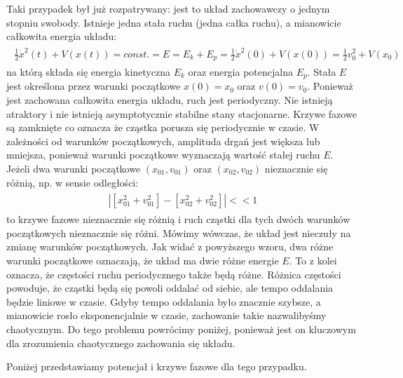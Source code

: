 \documentclass[a4paper,12pt,polish]{sphinxmanual}
\begin{document}
Taki przypadek był już rozpatrywany: jest to układ zachowawczy o jednym stopniu swobody. Istnieje jedna stała ruchu (jedna całka ruchu), a mianowicie całkowita energia układu:
\label{ch2/chII011:equation-eqn10}\begin{gather}
\begin{split}\frac{1}{2} \dot x^2(t) + V(x(t)) = const. = E  = E_k + E_p = \frac{1}{2} \dot x^2(0) + V(x(0)) = \frac{1}{2}  v_0^2 + V(x_0)\end{split}\label{ch2/chII011-eqn10}
\end{gather}
na którą składa się energia kinetyczna $E_k$ oraz energia potencjalna $E_p$.  Stała $E$ jest określona przez warunki początkowe $x(0) = x_0$ oraz $v(0) = v_0$.  Ponieważ jest zachowana całkowita energia układu, ruch jest periodyczny. Nie istnieją atraktory i nie istnieją  asymptotycznie stabilne stany stacjonarne. Krzywe fazowe są zamknięte co oznacza że  cząstka porusza się periodycznie w czasie. W zależności od warunków początkowych, amplituda drgań jest większa lub mniejsza, ponieważ warunki początkowe wyznaczają wartość stałej ruchu $E$. Jeżeli dwa warunki początkowe $(x_{01}, v_{01})$  oraz  $(x_{02}, v_{02})$ nieznacznie się różnią, np. w sensie odległości:
\label{ch2/chII011:equation-eqn11}\begin{gather}
\begin{split}| [x_{01}^2 +  v_{01}^2] - [x_{02}^2 +  v_{02}^2] | << 1\end{split}\label{ch2/chII011-eqn11}
\end{gather}
to krzywe fazowe nieznacznie się różnią i ruch cząstki dla tych dwóch warunków początkowych nieznacznie się różni. Mówimy wówczas, że układ jest nieczuły na zmianę warunków początkowych.  Jak widać z powyższego wzoru, dwa różne warunki początkowe oznaczają, że układ ma dwie różne energie $E$. To z kolei oznacza, że częstości ruchu periodycznego także będą różne.  Różnica częstości powoduje, że cząstki  będą się powoli oddalać od siebie, ale tempo oddalania będzie liniowe w czasie.  Gdyby tempo oddalania było znacznie szybsze, a mianowicie rosło eksponencjalnie w czasie, zachowanie takie nazwalibyśmy chaotycznym.  Do tego problemu powrócimy poniżej, ponieważ jest on kluczowym dla zrozumienia chaotycznego zachowania się układu.

Poniżej przedstawiamy potencjał i  krzywe fazowe dla tego przypadku.
\end{document}
